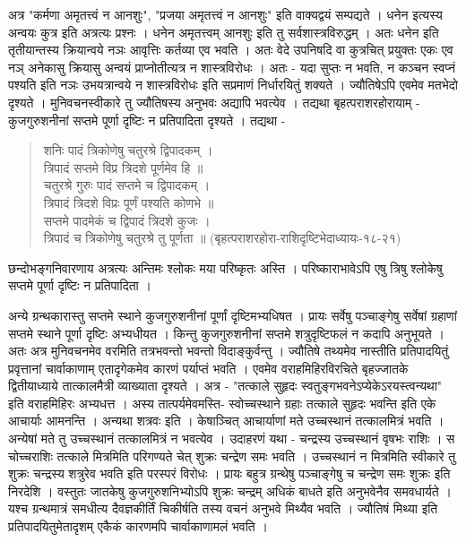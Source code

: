 {अत्र "कर्मणा अमृतत्त्वं न आनशुः", "प्रजया अमृतत्त्वं न आनशुः" इति वाक्यद्वयं सम्पद्यते । धनेन इत्यस्य अन्वयः कुत्र इति अत्रत्यः प्रश्नः । धनेन अमृतत्त्वम् आनशुः इति तु सर्वशास्त्रविरुद्धम् । अतः धनेन इति तृतीयान्तस्य क्रियान्वये नञः आवृत्तिः कर्तव्या एव भवति । अतः वेदे उपनिषदि वा कुत्रचित् प्रयुक्तः एकः एव नञ् अनेकासु क्रियासु अन्वयं प्राप्नोतीत्यत्र न शास्त्रविरोधः । अतः - यदा सुप्तः न भवति, न कञ्चन स्वप्नं पश्यति इति नञः उभयत्रान्वये न शास्त्रविरोधः इति सप्रमाणं निर्धारयितुं शक्यते । ज्यौतिषेऽपि एवमेव मतभेदो दृश्यते । मुनिवचनस्वीकारे तु ज्यौतिषस्य अनुभवः अद्यापि भवत्येव । तद्यथा बृहत्पराशरहोरायाम् - कुजगुरुशनीनां सप्तमे पूर्णा दृष्टिः न प्रतिपादिता दृश्यते । तद्यथा -
\begin{verse}
शनिः पादं त्रिकोणेषु चतुरश्रे द्विपादकम् ।\\
त्रिपादं सप्तमे विप्र त्रिदशे पूर्णमेव हि ॥\\
चतुरश्रे गुरुः पादं सप्तमे च द्विपादकम् ।\\
त्रिपादं त्रिदशे विप्रः पूर्णं पश्यति कोणभे ॥\\
सप्तमे पादमेकं च द्विपादं त्रिदशे कुजः ।\\
त्रिपादं च त्रिकोणेषु चतुरश्रे तु पूर्णता ॥ (बृहत्पराशरहोरा-राशिदृष्टिभेदाध्यायः-१८-२१)
\end{verse}
छन्दोभङ्गनिवारणाय अत्रत्यः अन्तिमः श्लोकः मया परिष्कृतः अस्ति । परिष्काराभावेऽपि एषु त्रिषु श्लोकेषु सप्तमे पूर्णा दृष्टिः न प्रतिपादिता ।  

अन्ये ग्रन्थकारास्तु सप्तमे स्थाने कुजगुरुशनीनां पूर्णां दृष्टिमभ्यधिषत । प्रायः सर्वेषु पञ्चाङ्गेषु सर्वेषां ग्रहाणां सप्तमे स्थाने पूर्णा दृष्टिः अभ्यधीयत । किन्तु कुजगुरुशनीनां सप्तमे शत्रुदृष्टिफलं न कदापि अनुभूयते । अतः अत्र मुनिवचनमेव वरमिति तत्रभवन्तो भवन्तो विदाङ्कुर्वन्तु । ज्यौतिषे तथ्यमेव नास्तीति प्रतिपादयितुं प्रवृत्तानां चार्वाकाणाम् एतादृगेकमेव कारणं पर्याप्तं भवति । एवमेव वराहमिहिरविरचिते बृहज्जातके द्वितीयाध्याये तात्कालमैत्री व्याख्याता दृश्यते । अत्र - "तत्काले सुहृदः स्वतुङ्गभवनेऽप्येकेऽरयस्त्वन्यथा" इति वराहमिहिरः अभ्यधत्त । अस्य तात्पर्यमेवमस्ति- स्वोच्चस्थाने ग्रहाः तत्काले  सुहृदः भवन्ति इति एके आचार्याः आमनन्ति । अन्यथा शत्रवः इति । केषाञ्चित् आचार्याणां मते उच्चस्थानं तत्कालमित्रं भवति । अन्येषां मते तु उच्चस्थानं तत्कालमित्रं न भवत्येव । उदाहरणं यथा - चन्द्रस्य उच्चस्थानं वृषभः राशिः । स चोच्चराशिः तत्काले मित्रमिति परिगण्यते चेत् शुक्रः चन्द्रेण समः भवति । उच्चस्थानं न मित्रमिति स्वीकारे तु शुक्रः चन्द्रस्य शत्रुरेव भवति इति परस्परं विरोधः । प्रायः बहुत्र ग्रन्थेषु पञ्चाङ्गेषु च चन्द्रेण समः शुक्रः इति निरदेशि । वस्तुतः जातकेषु कुजगुरुशनिभ्योऽपि शुक्रः चन्द्रम् अधिकं बाधते इति अनुभवेनैव समवधार्यते । यश्च ग्रन्थमात्रं समधीत्य दैवज्ञकीर्तिं चिकीर्षति तस्य वचनं अनुभवे मिथ्यैव भवति । ज्यौतिषं मिथ्या इति प्रतिपादयितुमेतादृशम् एकैकं कारणमपि चार्वाकाणामलं भवति ।

}

